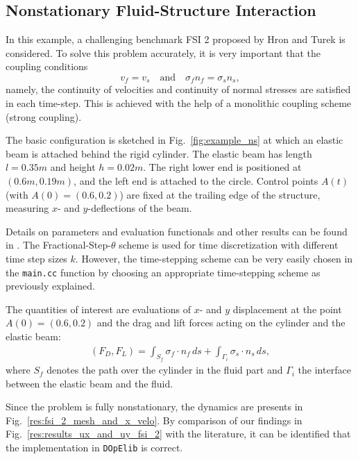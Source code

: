 \documentclass[smallextended]{svjour3}       %
\numberwithin{equation}{section}
\newcommand{\dope}{\texttt{DOpElib}}
\begin{document}
\subsection{Nonstationary Fluid-Structure Interaction}
In this example, a challenging benchmark FSI 2
proposed by Hron and Turek \cite{HrTu06b} is considered.
To solve this problem accurately, it is very important that 
the coupling conditions
\[
v_f = v_s \quad \text{and} \quad \sigma_f n_f = \sigma_s n_s, 
\]
namely, the continuity of velocities and continuity of normal stresses
are satisfied in each time-step. This is achieved with the help of 
a monolithic coupling scheme (strong coupling).

The basic configuration is 
sketched in Fig.~\ref{fig:example_ns} at which an elastic beam is attached 
behind the rigid cylinder. 
The elastic beam has length
$l=0.35m$ and height $h=0.02m$. The right lower end is positioned at 
$(0.6m,0.19m)$, and
the left end is attached to the circle. 
Control points $A(t)$ (with $A(0) = (0.6,0.2)$) are fixed at the 
trailing edge of the structure, measuring $x$- and $y$-deflections of the beam.

Details 
on parameters and evaluation functionals and other results 
can be found in \cite{HrTu06b,BuSc06,DeHaeAnnBrVie10,Wi11}. 
The Fractional-Step-$\theta$ scheme is used for time discretization with
different time step sizes $k$. However, the time-stepping scheme can be 
very easily chosen in the \texttt{main.cc} function by choosing an appropriate 
time-stepping scheme as previously explained.

The quantities of interest are evaluations of 
$x$- and $y$ displacement at the point $A(0) = (0.6,0.2)$
and the drag and lift forces acting on the cylinder and the elastic beam:
\begin{align}
\label{drag_lift_forces}
(F_D , F_L) 
= {\int_{S_f} \sigma_f \cdot n_f \, ds + 
\int_{\Gamma_i} \sigma_s \cdot n_s \, ds},
\end{align}
where $S_{f}$ denotes the path over the cylinder in the fluid part and
$\Gamma_i$ the interface between the elastic beam and the 
fluid.

Since the problem is fully nonstationary, the 
dynamics are presents in Fig.~\ref{res:fsi_2_mesh_and_x_velo}. 
By comparison of our findings in Fig.~\ref{res:results_ux_and_uy_fsi_2}
with the literature, it can be identified that 
the implementation in \dope{} is correct.
\end{document}
